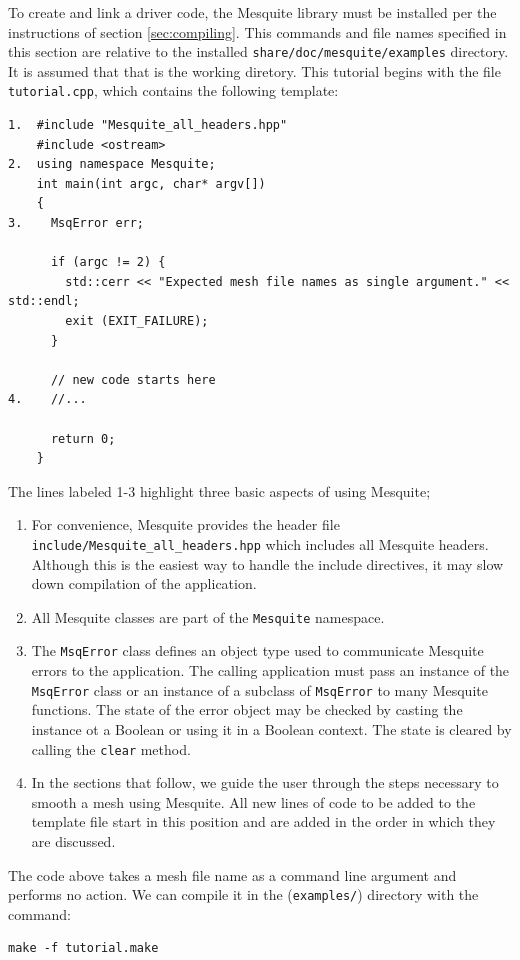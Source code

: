 To create and link a driver code, the Mesquite library must be
installed per the instructions of section \ref{sec:compiling}. 
This commands and file names specified in this section are relative 
to the installed \texttt{share/doc/mesquite/examples} directory.  It 
is assumed that that is the working diretory.
This tutorial begins with the file \texttt{tutorial.cpp}, 
which contains the following template:
\begin{verbatim}
1.  #include "Mesquite_all_headers.hpp"
    #include <ostream>
2.  using namespace Mesquite;
    int main(int argc, char* argv[])
    {
3.    MsqError err;

      if (argc != 2) {
        std::cerr << "Expected mesh file names as single argument." << std::endl;
        exit (EXIT_FAILURE);
      }

      // new code starts here
4.    //... 

      return 0;
    }
\end{verbatim}
The lines labeled 1-3 highlight three basic aspects of using Mesquite;
\begin{enumerate}
\item For convenience, Mesquite provides the header file
\texttt{include/Mesquite\_all\_headers.hpp} which includes all Mesquite
headers. Although this is the easiest way to handle the include directives,
it may slow down compilation of the application.  
\item All Mesquite classes are part of the \texttt{Mesquite} namespace. 

\item  The \texttt{MsqError} class defines an object type used to communicate
Mesquite errors to the application.  The calling application must pass
an instance of the \texttt{MsqError} class or an instance of a subclass of
\texttt{MsqError} to many Mesquite functions.  The state of the error object
may be checked by casting the instance ot a Boolean or using it in a 
Boolean context.  The state is cleared by calling the \texttt{clear} method.
\item In the sections that follow, we guide the user through the steps
necessary to smooth a mesh using Mesquite.  All new lines of code to be
added to the template file start in this position and are added in the order
in which they are discussed.
\end{enumerate}

The code above takes a mesh file name as a command line argument and
performs no action. We can compile it in the 
(\texttt{examples/}) directory with the command:
\begin{verbatim}
make -f tutorial.make
\end{verbatim}

